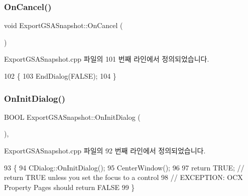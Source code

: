 \subsubsection{\texorpdfstring{On\+Cancel()}{OnCancel()}}
{\footnotesize\ttfamily void Export\+G\+S\+A\+Snapshot\+::\+On\+Cancel (\begin{DoxyParamCaption}{ }\end{DoxyParamCaption})\hspace{0.3cm}{\ttfamily [protected]}}



Export\+G\+S\+A\+Snapshot.\+cpp 파일의 101 번째 라인에서 정의되었습니다.


\begin{DoxyCode}
102 \{
103   EndDialog(FALSE);
104 \}
\end{DoxyCode}
\mbox{\label{class_export_g_s_a_snapshot_a1fb347339492a091f3a550767b16ed06}} 
\subsubsection{\texorpdfstring{On\+Init\+Dialog()}{OnInitDialog()}}
{\footnotesize\ttfamily B\+O\+OL Export\+G\+S\+A\+Snapshot\+::\+On\+Init\+Dialog (\begin{DoxyParamCaption}{ }\end{DoxyParamCaption})\hspace{0.3cm}{\ttfamily [protected]}, {\ttfamily [virtual]}}



Export\+G\+S\+A\+Snapshot.\+cpp 파일의 92 번째 라인에서 정의되었습니다.


\begin{DoxyCode}
93 \{
94   CDialog::OnInitDialog();
95   CenterWindow();
96   
97   \textcolor{keywordflow}{return} TRUE;  \textcolor{comment}{// return TRUE unless you set the focus to a control}
98                 \textcolor{comment}{// EXCEPTION: OCX Property Pages should return FALSE}
99 \}
\end{DoxyCode}
\mbox{\label{class_export_g_s_a_snapshot_ae057bb5c974df748b1adedfc5bcdca58}} 
